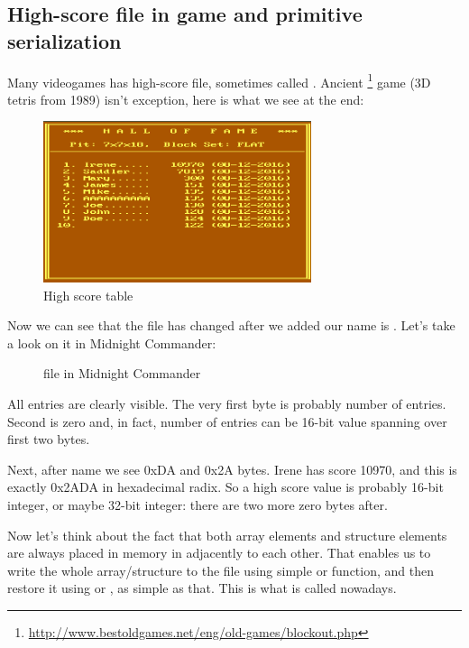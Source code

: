 \subsection{High-score file in  game and primitive serialization}

Many videogames has high-score file, sometimes called .
Ancient \footnote{\url{http://www.bestoldgames.net/eng/old-games/blockout.php}} game
(3D tetris from 1989) isn't exception, here is what we see at the end:

\begin{figure}[H]
\centering
\includegraphics[width=0.7\textwidth]{advanced/550_more_structs/blockout/hs.png}
\caption{High score table}
\end{figure}

Now we can see that the file has changed after we added our name is .
Let's take a look on it in Midnight Commander:

\begin{figure}[H]
\centering
{}
\caption{ file in Midnight Commander}
\end{figure}

All entries are clearly visible.
The very first byte is probably number of entries.
Second is zero and, in fact, number of entries can be 16-bit value spanning over first two bytes.

Next, after  name we see 0xDA and 0x2A bytes.
Irene has score 10970, and this is exactly 0x2ADA in hexadecimal radix.
So a high score value is probably 16-bit integer, or maybe 32-bit integer: there are two more zero bytes after.

Now let's think about the fact that both array elements and structure elements are always placed in memory in adjacently to each other.
That enables us to write the whole array/structure to the file using simple  or  function, 
and then restore it using  or , as simple as that.
This is what is called  nowadays.

